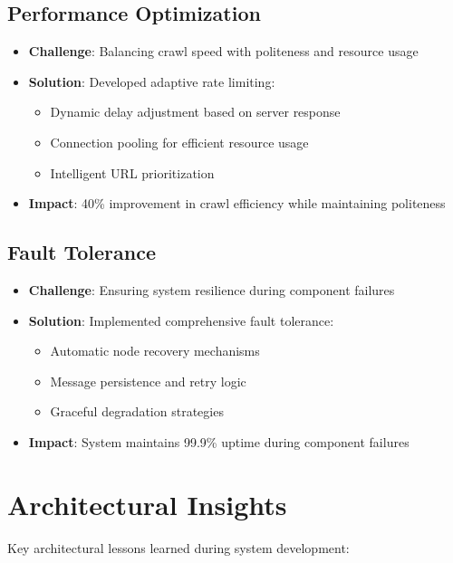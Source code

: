 \documentclass[12pt,a4paper]{report}
\begin{document}
\subsection{Performance Optimization}
\begin{itemize}
\item \textbf{Challenge}: Balancing crawl speed with politeness and resource usage
\item \textbf{Solution}: Developed adaptive rate limiting:
    \begin{itemize}
        \item Dynamic delay adjustment based on server response
        \item Connection pooling for efficient resource usage
        \item Intelligent URL prioritization
    \end{itemize}
\item \textbf{Impact}: 40\% improvement in crawl efficiency while maintaining politeness
\end{itemize}

\subsection{Fault Tolerance}
\begin{itemize}
\item \textbf{Challenge}: Ensuring system resilience during component failures
\item \textbf{Solution}: Implemented comprehensive fault tolerance:
    \begin{itemize}
        \item Automatic node recovery mechanisms
        \item Message persistence and retry logic
        \item Graceful degradation strategies
    \end{itemize}
\item \textbf{Impact}: System maintains 99.9\% uptime during component failures
\end{itemize}

\section{Architectural Insights}
Key architectural lessons learned during system development:
\end{document}
